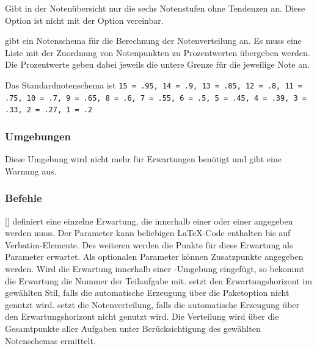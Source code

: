 \begin{options}
     Gibt in der Notenübersicht nur die sechs Notenstufen ohne Tendenzen an. Diese Option ist nicht mit der Option  vereinbar. 

     gibt ein Notenschema für die Berechnung der Notenverteilung an. Es muss eine Liste mit der Zuordnung von Notenpunkten zu Prozentwerten übergeben werden. Die Prozentwerte geben dabei jeweils die untere Grenze für die jeweilige Note an.

    Das Standardnotenschema ist \texttt{15 = .95, 14 = .9, 13 = .85, 12 = .8, 11 = .75, 10 = .7, 9 = .65, 8 = .6, 7 = .55, 6 = .5, 5 = .45, 4 = .39, 3 = .33, 2 = .27, 1 = .2}
\end{options}

\subsubsection{Umgebungen}
\begin{environments}
      Diese Umgebung wird nicht mehr für Erwartungen benötigt und gibt eine Warnung aus.
\end{environments}

\subsubsection{Befehle}
\begin{commands}
    [] definiert eine einzelne Erwartung, die innerhalb einer  oder einer  angegeben werden muss. Der Parameter kann beliebigen \LaTeX-Code enthalten bis auf Verbatim-Elemente. Des weiteren werden die Punkte für diese Erwartung als Parameter erwartet. Als optionalen Parameter können Zusatzpunkte angegeben werden. Wird die Erwartung innerhalb einer -Umgebung eingefügt, so bekommt die Erwartung die Nummer der Teilaufgabe mit.
     setzt den Erwartungshorizont im gewählten Stil, falls die automatische Erzeugung über die Paketoption  nicht genutzt wird.
     setzt die Notenverteilung, falls die automatische Erzeugung über den Erwartungshorizont nicht genutzt wird. Die Verteilung wird über die Gesamtpunkte aller Aufgaben unter Berücksichtigung des gewählten Notenschemas ermittelt.
\end{commands}
